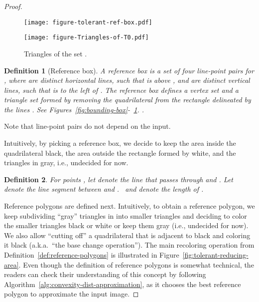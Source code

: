 \documentclass[11pt,english]{article}
\newtheorem{definition}{Definition}[section]
\numberwithin{figure}{section}
\begin{document}
\begin{proof}
\ifnum{}
\begin{figure}[ht]
\begin{minipage}[b]{0.45\linewidth}
\centering
\texttt{[image: figure-tolerant-ref-box.pdf]}
\caption{ A reference box.}
\label{fig:bounding-box}
\end{minipage}
\hspace{0.1\linewidth}
\begin{minipage}[b]{0.45\linewidth}
\centering
\texttt{[image: figure-Triangles-of-T0.pdf]}
\caption{ Triangles of the set .}
\label{fig:triangles-T0}
\end{minipage}
\end{figure}
\fi


\begin{definition}[Reference box]\label{def:reference-box}
A {\em reference box} is a set of four line-point pairs  for , where  are distinct horizontal lines, such that  is above , and  are distinct vertical lines, such that  is to the left of . The reference box defines a vertex set  and a triangle set  formed by removing the quadrilateral  from the rectangle delineated by the lines \ifnum{}.
See Figures~\ref{fig:bounding-box}-~\ref{fig:triangles-T0}.
\else
.
\fi
\end{definition}
\ifnum{}
Note that line-point pairs do not depend on the input.
\else

\fi
Intuitively, by picking a reference box, we decide to keep the area inside the quadrilateral  black, the area outside the rectangle formed by  white, and the triangles in  gray, i.e., undecided for now.

\begin{definition}
For points , let  denote the line that passes through  and . Let  denote the line segment between  and \ifnum{} . \else\ and  denote the length of .\fi
\end{definition}

Reference polygons are defined next.  Intuitively, to obtain a reference polygon, we keep subdividing ``gray'' triangles in  into smaller triangles and deciding to color the smaller triangles black or white or keep them gray (i.e., undecided for now). We also allow ``cutting off'' a quadrilateral that is adjacent to black and coloring it black (a.k.a.\ ``the base change operation'').
\ifnum{}
The main recoloring operation from Definition~\ref{def:reference-polygons} is illustrated in Figure~\ref{fig:tolerant-reducing-area}.
\fi
Even though the definition of reference polygons is somewhat technical, the readers can check their understanding of this concept by following Algorithm~\ref{alg:convexity-dist-approximation}, as it chooses the best reference polygon to approximate the input image.


\end{proof}
\end{document}
